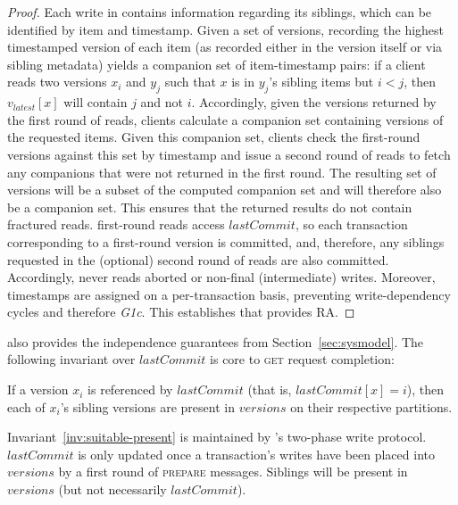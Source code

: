 \begin{proof}
\label{proof:rapl-ra}
Each write in \rapl contains information regarding its siblings, which
can be identified by item and timestamp. Given a set of \rapl
versions, recording the highest timestamped version of each item (as
recorded either in the version itself or via sibling metadata) yields
a companion set of item-timestamp pairs: if a client reads two
versions $x_i$ and $y_j$ such that $x$ is in $y_j$'s sibling items but
$i < j$, then $v_{latest}[x]$ will contain $j$ and not
$i$. Accordingly, given the versions returned by the first round of
\rapl reads, clients calculate a companion set containing versions of
the requested items. Given this companion set, clients check the
first-round versions against this set by timestamp and issue a second
round of reads to fetch any companions that were not returned in the
first round. The resulting set of versions will be a subset of the
computed companion set and will therefore also be a companion
set. This ensures that the returned results do not contain fractured
reads. \rapl first-round reads access $lastCommit$, so each
transaction corresponding to a first-round version is committed, and,
therefore, any siblings requested in the (optional) second round of
reads are also committed. Accordingly, \rapl never reads aborted or
non-final (intermediate) writes. Moreover, \rapl timestamps are
assigned on a per-transaction basis, preventing write-dependency
cycles and therefore \textit{G1c}. This establishes that \rapl
provides RA\@.
\end{proof}

 \rapl also provides the
independence guarantees from Section~\ref{sec:sysmodel}. The
following invariant over $lastCommit$ is core to \rapl \textsc{get}
request completion:
\begin{invariant}
\label{inv:suitable-present}

If a version $x_i$ is referenced by $lastCommit$ (that is,
$lastCommit[x] = i$), then each of $x_i$'s sibling versions are
present in $versions$ on their respective partitions.

\end{invariant}
Invariant~\ref{inv:suitable-present} is maintained by \rapl's
two-phase write protocol. $lastCommit$ is only updated once a
transaction's writes have been placed into $versions$ by a first round
of \textsc{prepare} messages. Siblings will be present in $versions$
(but not necessarily $lastCommit$).

